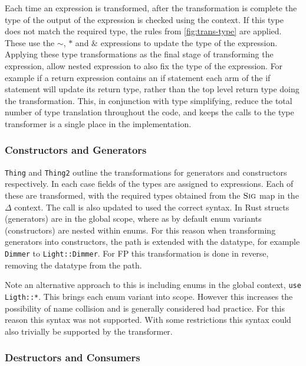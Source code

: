 \documentclass[ oneside,%
                    author={James Elgar},
                    degree={MEng},
                     title={Bidirectional transformer between functional and \\ object-oriented programming in Rust},
                  subtitle={}]{dissertation}
\newcommand{\rust}[1]{\texttt{#1}}
\begin{document}
Each time an expression is transformed, after the transformation is complete the type of the output of the expression is checked using the context. If this type does not match the required type, the rules from \autoref{fig:trans-type} are applied. These use the $\sim$, $*$ and $\&$ expressions to update the type of the expression. Applying these type transformations as the final stage of transforming the expression, allow nested expression to also fix the type of the expression. For example if a return expression contains an if statement each arm of the if statement will update its return type, rather than the top level return type doing the transformation. This, in conjunction with type simplifying, reduce the total number of type translation throughout the code, and keeps the calls to the type transformer is a single place in the implementation.


\subsubsection{Constructors and Generators}

\verb|Thing| and \verb|Thing2| outline the transformations for generators and constructors respectively. In each case fields of the types are assigned to expressions. Each of these are transformed, with the required types obtained from the $\textsc{Sig}$ map in the $\Delta$ context. The call is also updated to used the correct syntax. In Rust structs (generators) are in the global scope, where as by default enum variants (constructors) are nested within enums. For this reason when transforming generators into constructors, the path is extended with the datatype, for example \rust{Dimmer} to \rust{Light::Dimmer}. For FP this transformation is done in reverse, removing the datatype from the path.

Note an alternative approach to this is including enums in the global context, \rust{use Ligth::*}. This brings each enum variant into scope. However this increases the possibility of name collision and is generally considered bad practice. For this reason this syntax was not supported. With some restrictions this syntax could also trivially be supported by the transformer.

\subsubsection{Destructors and Consumers}
\end{document}

